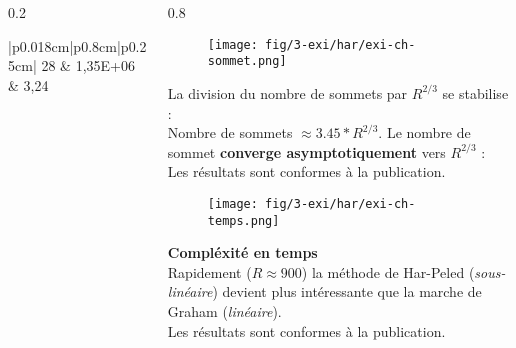 \begin{frame}
\begin{columns}[t]
\begin{column}{0.2\linewidth}
\begin{tiny}
\begin{table}[H]
\begin{tabular}{|p{0.018cm}|p{0.8cm}|p{0.25cm}|}
          28 & 1,35E+06  & 3,24\\
          \hline
        \end{tabular} 
        \label{tab:ch} 
      \end{table}
    \end{tiny}
  \end{column}
  \begin{column}{0.8\linewidth}
    \vspace{-0.6cm}
    {
      \begin{figure}[H]
        \centering
        \texttt{[image: fig/3-exi/har/exi-ch-sommet.png]}       
      \end{figure}
      \vspace{-0.3cm}
      \begin{exampleblock}{}
        La division du nombre de sommets par $R^{2/3}$ se stabilise :\\
        Nombre de sommets $ \approx 3.45 * R^{2/3}$.  
        Le nombre de sommet \textbf{converge asymptotiquement} vers $R^{2/3}$ : \\
        Les résultats sont conformes à la publication. \\

     \end{exampleblock}
    }
    
    {
      \begin{figure}[H]
        \centering
        \texttt{[image: fig/3-exi/har/exi-ch-temps.png]}
      \end{figure}
      \vspace{-0.3cm}
      \begin{exampleblock}{}
        \textbf{Compléxité en temps}\\
        Rapidement  ($R \approx 900$) la méthode de Har-Peled (\textit{sous-linéaire}) devient plus intéressante que la marche de Graham (\textit{linéaire}).\\
        Les résultats sont conformes à la publication.
      \end{exampleblock}
    }
       
  \end{column}  
\end{columns}



\end{frame}





